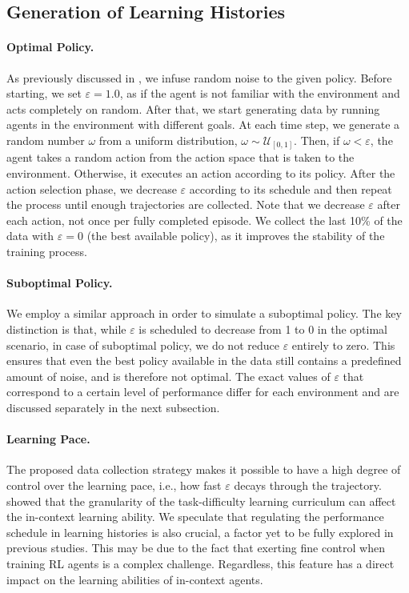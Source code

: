 \documentclass{article}
\theoremstyle{plain}
\theoremstyle{definition}
\theoremstyle{remark}
\begin{document}
\subsection{Generation of Learning Histories}
\label{subsec:gen}
\paragraph{Optimal Policy.} As previously discussed in , we infuse random noise to the given policy. Before starting, we set $\varepsilon=1.0$, as if the agent is not familiar with the environment and acts completely on random. After that, we start generating data by running agents in the environment with different goals. At each time step, we generate a random number $\omega$ from a uniform distribution, $\omega \sim \mathcal{U}_{[0, 1]}$. Then, if $\omega < \varepsilon$, the agent takes a random action from the action space that is taken to the environment. Otherwise, it executes an action according to its policy. After the action selection phase, we decrease $\varepsilon$ according to its schedule and then repeat the process until enough trajectories are collected. Note that we decrease $\varepsilon$ after each action, not once per fully completed episode. We collect the last 10\% of the data with $\varepsilon=0$ (the best available policy), as it improves the stability of the training process.

\paragraph{Suboptimal Policy.}
We employ a similar approach in order to simulate a suboptimal policy. The key distinction is that, while $\varepsilon$ is scheduled to decrease from 1 to 0 in the optimal scenario, in case of suboptimal policy, we do not reduce $\varepsilon$ entirely to zero. This ensures that even the best policy available in the data still contains a predefined amount of noise, and is therefore not optimal. The exact values of $\varepsilon$ that correspond to a certain level of performance differ for each environment and are discussed separately in the next subsection.

\paragraph{Learning Pace.}
The proposed data collection strategy makes it possible to have a high degree of control over the learning pace, i.e., how fast $\varepsilon$ decays through the trajectory. \citet{shi2023crossepisodic} showed that the granularity of the task-difficulty learning curriculum can affect the in-context learning ability. We speculate that regulating the performance schedule in learning histories is also crucial, a factor yet to be fully explored in previous studies. This may be due to the fact that exerting fine control when training RL agents is a complex challenge. Regardless, this feature has a direct impact on the learning abilities of in-context agents. 
\end{document}
